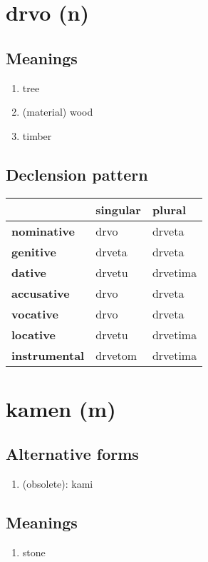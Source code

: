 \filbreak
\section{drvo (n)}
\subsection*{Meanings}
\begin{enumerate}
\item tree
\item (material) wood
\item timber
\end{enumerate}
\subsection*{Declension pattern}
\begin{tabularx}{\linewidth}{Xll}
\toprule
{} & singular &    plural \\
\midrule
\textbf{nominative  } &     drvo &    drveta \\
\textbf{genitive    } &   drveta &    drveta \\
\textbf{dative      } &   drvetu &  drvetima \\
\textbf{accusative  } &     drvo &    drveta \\
\textbf{vocative    } &     drvo &    drveta \\
\textbf{locative    } &   drvetu &  drvetima \\
\textbf{instrumental} &  drvetom &  drvetima \\
\bottomrule
\end{tabularx}

\filbreak
\section{kamen (m)}
\subsection*{Alternative forms}
\begin{enumerate}
\item (obsolete): kami
\end{enumerate}
\subsection*{Meanings}
\begin{enumerate}
\item stone
\end{enumerate}

